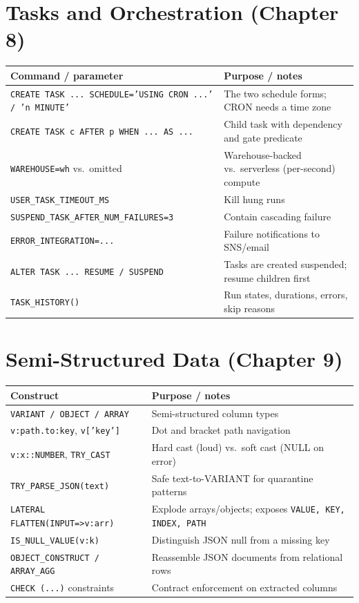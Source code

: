 \section{Tasks and Orchestration (Chapter 8)}
\begin{center}
\footnotesize
\begin{tabular}{@{}p{5.6cm}p{8.6cm}@{}}
\toprule
\textbf{Command / parameter} & \textbf{Purpose / notes} \\
\midrule
\texttt{CREATE TASK ... SCHEDULE='USING CRON ...' / 'n MINUTE'} & The two schedule forms; CRON needs a time zone \\
\texttt{CREATE TASK c AFTER p WHEN ... AS ...} & Child task with dependency and gate predicate \\
\texttt{WAREHOUSE=wh} vs.\ omitted & Warehouse-backed vs.\ serverless (per-second) compute \\
\texttt{USER\_TASK\_TIMEOUT\_MS} & Kill hung runs \\
\texttt{SUSPEND\_TASK\_AFTER\_NUM\_FAILURES=3} & Contain cascading failure \\
\texttt{ERROR\_INTEGRATION=...} & Failure notifications to SNS/email \\
\texttt{ALTER TASK ... RESUME / SUSPEND} & Tasks are created suspended; resume children first \\
\texttt{TASK\_HISTORY()} & Run states, durations, errors, skip reasons \\
\bottomrule
\end{tabular}
\end{center}

\section{Semi-Structured Data (Chapter 9)}
\begin{center}
\footnotesize
\begin{tabular}{@{}p{5.6cm}p{8.6cm}@{}}
\toprule
\textbf{Construct} & \textbf{Purpose / notes} \\
\midrule
\texttt{VARIANT / OBJECT / ARRAY} & Semi-structured column types \\
\texttt{v:path.to:key}, \texttt{v['key']} & Dot and bracket path navigation \\
\texttt{v:x::NUMBER}, \texttt{TRY\_CAST} & Hard cast (loud) vs.\ soft cast (NULL on error) \\
\texttt{TRY\_PARSE\_JSON(text)} & Safe text-to-VARIANT for quarantine patterns \\
\texttt{LATERAL FLATTEN(INPUT=>v:arr)} & Explode arrays/objects; exposes \texttt{VALUE, KEY, INDEX, PATH} \\
\texttt{IS\_NULL\_VALUE(v:k)} & Distinguish JSON null from a missing key \\
\texttt{OBJECT\_CONSTRUCT / ARRAY\_AGG} & Reassemble JSON documents from relational rows \\
\texttt{CHECK (...)} constraints & Contract enforcement on extracted columns \\
\bottomrule
\end{tabular}
\end{center}

